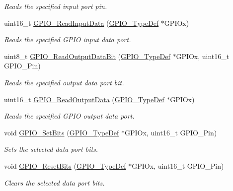 \begin{DoxyCompactItemize}
\begin{DoxyCompactList}\small\item\em Reads the specified input port pin. \end{DoxyCompactList}\item 
uint16\+\_\+t \hyperlink{group___g_p_i_o_ga139a33adc8409288e9f193bbebb5a0f7}{G\+P\+I\+O\+\_\+\+Read\+Input\+Data} (\hyperlink{struct_g_p_i_o___type_def}{G\+P\+I\+O\+\_\+\+Type\+Def} $\ast$G\+P\+I\+Ox)
\begin{DoxyCompactList}\small\item\em Reads the specified G\+P\+IO input data port. \end{DoxyCompactList}\item 
uint8\+\_\+t \hyperlink{group___g_p_i_o_ga138270f8695b105b7c6ed405792919c1}{G\+P\+I\+O\+\_\+\+Read\+Output\+Data\+Bit} (\hyperlink{struct_g_p_i_o___type_def}{G\+P\+I\+O\+\_\+\+Type\+Def} $\ast$G\+P\+I\+Ox, uint16\+\_\+t G\+P\+I\+O\+\_\+\+Pin)
\begin{DoxyCompactList}\small\item\em Reads the specified output data port bit. \end{DoxyCompactList}\item 
uint16\+\_\+t \hyperlink{group___g_p_i_o_gaf8938a34280b7dc3e39872a7c17bb323}{G\+P\+I\+O\+\_\+\+Read\+Output\+Data} (\hyperlink{struct_g_p_i_o___type_def}{G\+P\+I\+O\+\_\+\+Type\+Def} $\ast$G\+P\+I\+Ox)
\begin{DoxyCompactList}\small\item\em Reads the specified G\+P\+IO output data port. \end{DoxyCompactList}\item 
void \hyperlink{group___g_p_i_o_ga9e1352eed7c6620e18af2d86f6b6ff8e}{G\+P\+I\+O\+\_\+\+Set\+Bits} (\hyperlink{struct_g_p_i_o___type_def}{G\+P\+I\+O\+\_\+\+Type\+Def} $\ast$G\+P\+I\+Ox, uint16\+\_\+t G\+P\+I\+O\+\_\+\+Pin)
\begin{DoxyCompactList}\small\item\em Sets the selected data port bits. \end{DoxyCompactList}\item 
void \hyperlink{group___g_p_i_o_ga6fcd35b207a66608dd2c9d7de9247dc8}{G\+P\+I\+O\+\_\+\+Reset\+Bits} (\hyperlink{struct_g_p_i_o___type_def}{G\+P\+I\+O\+\_\+\+Type\+Def} $\ast$G\+P\+I\+Ox, uint16\+\_\+t G\+P\+I\+O\+\_\+\+Pin)
\begin{DoxyCompactList}\small\item\em Clears the selected data port bits. \end{DoxyCompactList}\item 

\end{DoxyCompactItemize}
